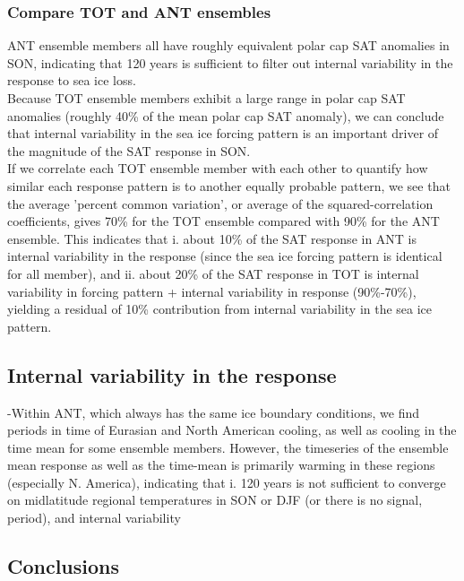 \documentclass[twocol]{ametsoc}
\begin{document}
\subsubsection{Compare TOT and ANT ensembles}
ANT ensemble members all have roughly equivalent polar cap SAT anomalies in SON, indicating that 120 years is sufficient to filter out internal variability in the response to sea ice loss. \\
Because TOT ensemble members exhibit a large range in polar cap SAT anomalies (roughly 40\% of the mean polar cap SAT anomaly), we can conclude that internal variability in the sea ice forcing pattern is an important driver of the magnitude of the SAT response in SON. \\
If we correlate each TOT ensemble member with each other to quantify how similar each response pattern is to another equally probable pattern, we see that the average 'percent common variation', or average of the squared-correlation coefficients, gives 70\% for the TOT ensemble compared with 90\% for the ANT ensemble. This indicates that i. about 10\% of the SAT response in ANT is internal variability in the response (since the sea ice forcing pattern is identical for all member), and ii. about 20\% of the SAT response in TOT is internal variability in forcing pattern + internal variability in response (90\%-70\%), yielding a residual of 10\% contribution from internal variability in the sea ice pattern.
 


\subsection{Internal variability in the response}

-Within ANT, which always has the same ice boundary conditions, we find periods in time of Eurasian and North American cooling, as well as cooling in the time mean for some ensemble members. However, the timeseries of the ensemble mean response as well as the time-mean is primarily warming in these regions (especially N. America), indicating that i. 120 years is not sufficient to converge on midlatitude regional temperatures in SON or DJF (or there is no signal, period), and internal variability 

\subsection{Conclusions}
\end{document}
